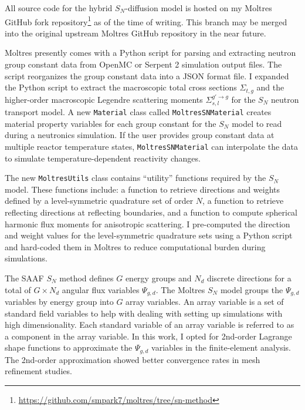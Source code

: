 All source code for the hybrid $S_N$-diffusion model is hosted on my Moltres GitHub fork
repository\footnote{\url{https://github.com/smpark7/moltres/tree/sn-method}} as of the time of
writing. This branch may be merged into the original upstream Moltres GitHub repository in the near
future.

Moltres presently comes with a Python script for parsing and extracting neutron group constant data
from OpenMC \cite{boyd_multigroup_2019} or Serpent 2 \cite{leppanen_serpent_2014} simulation
output files. The script reorganizes the group constant data into a
JSON format file. I expanded the Python script to extract
the macroscopic total cross sections $\Sigma_{t,g}$ and the higher-order macroscopic Legendre
scattering moments $\Sigma^{g'\rightarrow g}_{s,l}$ for the $S_N$ neutron transport model. A new
\texttt{Material} class called \texttt{MoltresSNMaterial} creates material
property variables for each group constant for the $S_N$ model to read during a neutronics
simulation. If the user provides group constant data at multiple reactor temperature states,
\texttt{MoltresSNMaterial} can interpolate the data to simulate temperature-dependent reactivity
changes.

The new \texttt{MoltresUtils} class contains ``utility'' functions required by the $S_N$ model.
These functions include: a function to retrieve directions and weights defined by a
level-symmetric quadrature set of order $N$, a function to retrieve reflecting directions at
reflecting boundaries, and a function to compute spherical harmonic flux moments for anisotropic
scattering. I pre-computed the direction and weight values for the level-symmetric quadrature sets
using a Python script and hard-coded them in Moltres to reduce computational burden during
simulations.

The \gls{SAAF} $S_N$ method defines $G$ energy groups and $N_d$ discrete directions for a total
of $G\times N_d$ angular flux variables $\Psi_{g,d}$. The Moltres $S_N$ model groups the
$\Psi_{g,d}$ variables by energy group into $G$ array variables. An array variable is a
set of standard field variables to help with dealing with setting up simulations with high
dimensionality. Each standard variable of an array variable is referred to as a component in the
array variable. In this work, I opted for
2nd-order Lagrange shape functions to approximate the $\Psi_{g,d}$ variables in the finite-element
analysis. The 2nd-order approximation showed better convergence rates in mesh refinement studies.

